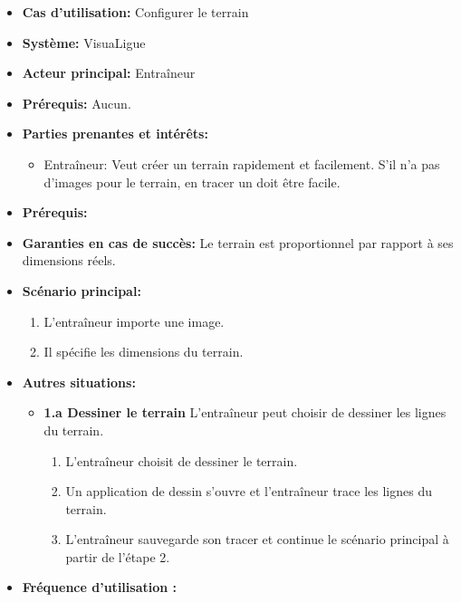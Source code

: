\begin{itemize}
    \item \textbf{Cas d'utilisation:} Configurer le terrain
    \item \textbf{Syst\`eme:} VisuaLigue
    \item \textbf{Acteur principal:} Entra\^ineur
    \item \textbf{Pr\'erequis:} Aucun.
    \item \textbf{Parties prenantes et int\'er\^ets:}
        \begin{itemize}
            \item Entraîneur: Veut créer un terrain rapidement et facilement. S'il n'a pas d'images pour le terrain, en tracer un doit être facile.
        \end{itemize}
    \item \textbf{Pr\'erequis:}
    \item \textbf{Garanties en cas de succ\`es:} Le terrain est proportionnel par rapport à ses dimensions réels.
    \item \textbf{Sc\'enario principal:}
        \begin{enumerate}
            \item L'entraîneur importe une image.
            \item Il spécifie les dimensions du terrain.
    \end{enumerate}
    \item \textbf{Autres situations:}
        \begin{itemize}
            \item \textbf{1.a Dessiner le terrain} L'entraîneur peut choisir de dessiner les lignes du terrain.
                \begin{enumerate}
                    \item L'entraîneur choisit de dessiner le terrain.
                    \item Un application de dessin s'ouvre et l'entraîneur trace les lignes du terrain.
                    \item L'entraîneur sauvegarde son tracer et continue le scénario principal à partir de l'étape 2.
               \end{enumerate}
 
        \end{itemize}
  	\item \textbf{Fréquence d'utilisation :}
\end{itemize}



